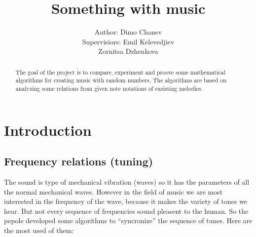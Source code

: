 \documentclass[]{article}
\title{Something with music}
\author{
    \begin{tabular}{rl}
        \normalsize{Author: } & \normalsize{Dimo Chanev} \\
        \scriptsize{Supervisiors: } & \scriptsize{Emil Kelevedjiev}\\
                                    & \scriptsize{Zornitsa Dzhenkova}
    \end{tabular}
}
\begin{document}
    \maketitle
    \newpage

    \tableofcontents

    \newpage
    \begin{abstract}
        The goal of the project is to compare, experiment and proove some mathematical algorithms for creating music with random numbers. The algorithms are based on analyzing some relations from given note notations of exsisting melodies.
    \end{abstract}

    \newpage

    \section{Introduction}
        \subsection { Frequency relations (tuning)}
            The sound is type of mechanical vibration (waves) so it has the parameters of all the normal mechanical waves. However in the field of music we are most interested in the frequency of the wave, because it makes the variety of tones we hear. But not every sequence of frequencies sound pleasent to the human. So the pepole developed some algorithms to ``syncronize'' the sequence of tunes. Here are the most used of them:
\end{document}
